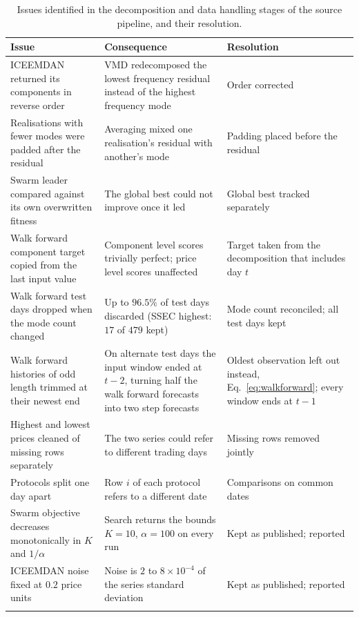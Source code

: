 \begin{table}[ht]
\caption{Issues identified in the decomposition and data handling stages of the source pipeline, and their resolution.}
\label{tab:audit_decomp}
\small
\begin{tabular}{@{}L{0.30\textwidth}L{0.39\textwidth}L{0.23\textwidth}@{}}
\toprule
Issue & Consequence & Resolution \\
\midrule
ICEEMDAN returned its components in reverse order &
VMD redecomposed the lowest frequency residual instead of the highest frequency mode &
Order corrected \\
Realisations with fewer modes were padded after the residual &
Averaging mixed one realisation's residual with another's mode &
Padding placed before the residual \\
Swarm leader compared against its own overwritten fitness &
The global best could not improve once it led &
Global best tracked separately \\
Walk forward component target copied from the last input value &
Component level scores trivially perfect; price level scores unaffected &
Target taken from the decomposition that includes day $t$ \\
Walk forward test days dropped when the mode count changed &
Up to $96.5\%$ of test days discarded (SSEC highest: $17$ of $479$ kept) &
Mode count reconciled; all test days kept \\
Walk forward histories of odd length trimmed at their newest end &
On alternate test days the input window ended at $t-2$, turning half the walk forward forecasts into two step forecasts &
Oldest observation left out instead, Eq.~\eqref{eq:walkforward}; every window ends at $t-1$ \\
Highest and lowest prices cleaned of missing rows separately &
The two series could refer to different trading days &
Missing rows removed jointly \\
Protocols split one day apart &
Row $i$ of each protocol refers to a different date &
Comparisons on common dates \\
Swarm objective decreases monotonically in $K$ and $1/\alpha$ &
Search returns the bounds $K=10$, $\alpha=100$ on every run &
Kept as published; reported \\
ICEEMDAN noise fixed at $0.2$ price units &
Noise is $2$ to $8\times10^{-4}$ of the series standard deviation &
Kept as published; reported \\
\botrule
\end{tabular}
\end{table}

